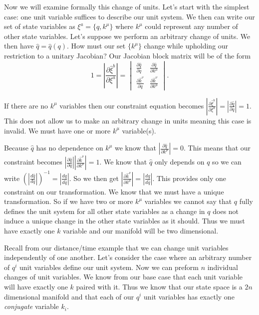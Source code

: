 \documentclass{article}
\begin{document}
	Now we will examine formally this change of units. Let's start with the simplest case: one unit variable suffices to describe our unit system. We then can write our set of state variables as $\xi^a = \{q,k^\mu\}$ where $k^\mu$ could represent any number of other state variables. Let's suppose we perform an arbitrary change of units. We then have $\hat{q} = \hat{q}(q)$. How must our set $\{k^\mu\}$ change while upholding our restriction to a unitary Jacobian? Our Jacobian block matrix will be of the form $$1 = \left|\frac{\partial\hat{\xi}^b}{\partial\xi^a}\right| = \begin{vmatrix}
\frac{\partial \hat{q}}{\partial q} & \frac{\partial \hat{q}}{\partial k^\mu} \\
\frac{\partial \hat{k}^\nu}{\partial q} & \frac{\partial \hat{k}^\nu}{\partial k^\mu}
\end{vmatrix}.$$

	If there are no $k^\mu$ variables then our constraint equation becomes $\left|\frac{\partial\hat{\xi}^b}{\partial\xi^a}\right| = \left|\frac{\partial \hat{q}}{\partial q}\right| = 1$. This does not allow us to make an arbitrary change in units meaning this case is invalid. We must have one or more $k^\mu$ variable(s).

	Because $\hat{q}$ has no dependence on $k^\mu$ we know that $\left|\frac{\partial \hat{q}}{\partial k^\mu}\right| = 0$. This means that our constraint becomes $\left|\frac{\partial \hat{q}}{\partial q}\right|\left|\frac{\partial \hat{k}^\nu}{\partial k^\mu}\right| = 1$. We know that $\hat{q}$ only depends on $q$ so we can write $(\left|\frac{d \hat{q}}{d q}\right|)^{-1} = \left|\frac{d q}{d \hat{q}}\right|$. So we then get $\left|\frac{\partial \hat{k}^\nu}{\partial k^\mu}\right| = \left|\frac{d q}{d \hat{q}}\right|$. This provides only one constraint on our transformation. We know that we must have a unique transformation. So if we have two or more $k^\mu$ variables we cannot say that $q$ fully defines the unit system for all other state variables as a change in $q$ does not induce a unique change in the other state variables as it should. Thus we must have exactly one $k$ variable and our manifold will be two dimensional.

	Recall from our distance/time example that we can change unit variables independently of one another. Let's consider the case where an arbitrary number of $q^i$ unit variables define our unit system. Now we can preform $n$ individual changes of unit variables. We know from our base case that each unit variable will have exactly one $k$ paired with it. Thus we know that our state space is a $2n$ dimensional manifold and that each of our $q^i$ unit variables has exactly one \textit{conjugate} variable $k_i$.
\end{document}
